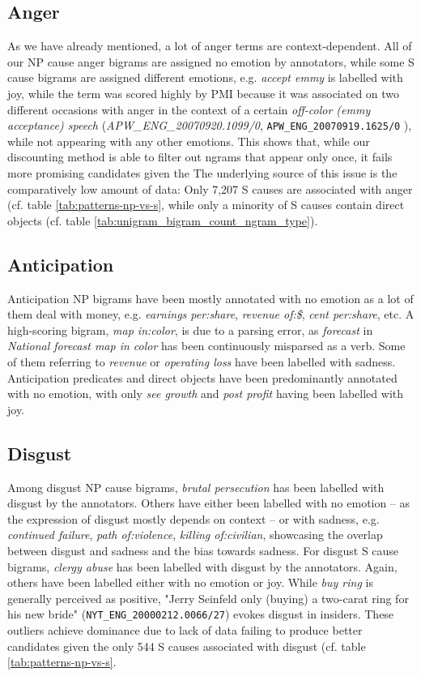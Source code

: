 \subsection{Anger}

As we have already mentioned, a lot of anger terms are context-dependent. All of our NP cause anger bigrams are assigned no emotion by annotators, while some S cause bigrams are assigned different emotions, e.g. \textit{accept emmy} is labelled with joy, while the term was scored highly by PMI because it was associated on two different occasions with anger in the context of a certain \textit{off-color (emmy acceptance) speech} (\textit{APW\_ENG\_20070920.1099/0}, \texttt{APW\_ENG\_20070919.1625/0} ), while not appearing with any other emotions. This shows that, while our discounting method is able to filter out ngrams that appear only once, it fails more promising candidates given the  The underlying source of this issue is the comparatively low amount of data: Only 7,207 S causes are associated with anger (cf. table \ref{tab:patterns-np-vs-s}, while only a minority of S causes contain direct objects (cf. table \ref{tab:unigram_bigram_count_ngram_type}).

\subsection{Anticipation}

Anticipation NP bigrams have been mostly annotated with no emotion as a lot of them deal with money, e.g. \textit{earnings per:share}, \textit{revenue of:\$}, \textit{cent per:share}, etc. A high-scoring bigram, \textit{map in:color}, is due to a parsing error, as \textit{forecast} in \textit{National forecast map in color} has been continuously misparsed as a verb. Some of them referring to \textit{revenue} or \textit{operating loss} have been labelled with sadness. Anticipation predicates and direct objects have been predominantly annotated with no emotion, with only \textit{see growth} and \textit{post profit} having been labelled with joy.

\subsection{Disgust}

Among disgust NP cause bigrams, \textit{brutal persecution} has been labelled with disgust by the annotators. Others have either been labelled with no emotion -- as the expression of disgust mostly depends on context -- or with sadness, e.g. \textit{continued failure}, \textit{path of:violence}, \textit{killing of:civilian}, showcasing the overlap between disgust and sadness and the bias towards sadness. For disgust S cause bigrams, \textit{clergy abuse} has been labelled with disgust by the annotators. Again, others have been labelled either with no emotion or joy. While \textit{buy ring} is generally perceived as positive, "Jerry Seinfeld only (buying) a two-carat ring for his new bride" (\texttt{NYT\_ENG\_20000212.0066/27}) evokes disgust in insiders. These outliers achieve dominance due to lack of data failing to produce better candidates given the only 544 S causes associated with disgust (cf. table \ref{tab:patterns-np-vs-s}.

